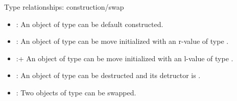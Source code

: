 \begin{frame}[t,fragile]{Type relationships: construction/swap}
\begin{itemize}
  \item {}:
        An object of type  can be default constructed.

  \item {}:
        An object of type  can be move initialized with
        an r-value of type .

  \item {}:+
        An object of type  can be move initialized with
        an l-value of type .

  \item {}:
        An object of type  can be destructed and its
        detructor is .

  \item {}:
        Two objects of type  can be swapped.
\end{itemize}
\end{frame}
